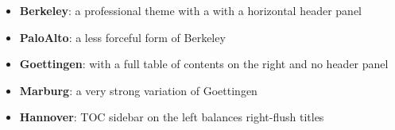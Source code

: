 \documentclass[notes=show,beamer]{beamer}
\begin{document}
\begin{frame}%

\hypertarget{toc}{}


\begin{itemize}
\item \textbf{Berkeley}: a professional theme with a with a horizontal
header panel

\item \textbf{PaloAlto}: a less forceful form of Berkeley

\item \textbf{Goettingen}: with a full table of contents on the right and no
header panel

\item \textbf{Marburg}: a very strong variation of Goettingen

\item \textbf{Hannover}: TOC sidebar on the left balances right-flush titles
\end{itemize}

\transboxout%
\end{frame}%
\end{document}
